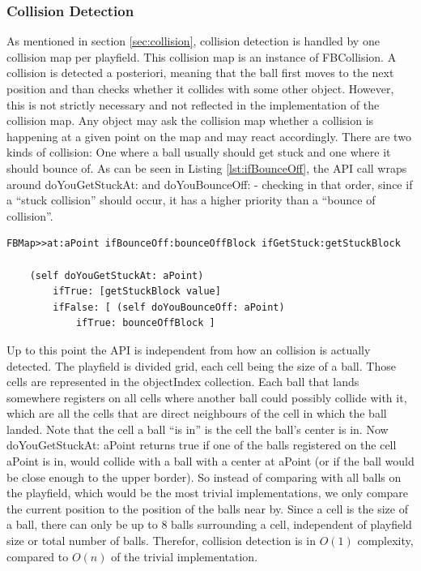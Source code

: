 \subsubsection{Collision Detection}
As mentioned in section
\ref{sec:collision}, 
collision detection is handled by one collision map per playfield. This collision
map is an instance of FBCollision. A collision is detected a posteriori, meaning
that the ball first moves to the next position and  than checks whether it collides
with some other object. However, this is not strictly necessary and not reflected in
the implementation of the collision map. Any object may ask the collision map whether
a collision is happening at a given point on the map and may react accordingly. There
are two kinds of collision: One where a ball usually should get stuck and one where it
should bounce of. As can be seen in Listing \ref{lst:ifBounceOff}, the API call wraps
around doYouGetStuckAt: and doYouBounceOff: - checking in that order, since if a ``stuck
collision'' should occur, it has a higher priority than a ``bounce of collision''.
% 
\begin{lstlisting}[caption=API method for detecting collision,label=lst:ifBounceOff]
FBMap>>at:aPoint ifBounceOff:bounceOffBlock ifGetStuck:getStuckBlock
	
	(self doYouGetStuckAt: aPoint)
		ifTrue: [getStuckBlock value]
		ifFalse: [ (self doYouBounceOff: aPoint)
			ifTrue: bounceOffBlock ]
\end{lstlisting}
%
Up to this point the API is independent from how an collision is actually detected.
The playfield is divided grid, each cell being the size of a ball. Those cells are represented
in the objectIndex collection. Each ball that lands somewhere registers on all cells where
another ball could possibly collide with it, which are all the cells that are direct neighbours
of the cell in which the ball landed. Note that the cell a ball ``is in'' is the cell the ball's
center is in. Now doYouGetStuckAt: aPoint returns true if one of the balls registered on the
cell aPoint is in, would collide with a ball with a center at aPoint (or if the ball would be
close enough to the upper border). So instead of comparing with all balls on the playfield, which
would be the most trivial implementations, we only compare the current position to the position
of the balls near by. Since a cell is the size of a ball, there can only be up to 8 balls surrounding
a cell, independent of playfield size or total number of balls. Therefor, collision detection is in
$O(1)$ complexity, compared to $O(n)$ of the trivial implementation.

